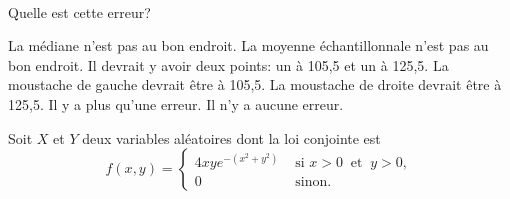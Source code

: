 \begin{questions}
\begin{center}
\begin{tikzpicture}[x=0.4cm,y=0.9cm]
			\end{tikzpicture}\\
	\end{center}



Quelle est cette erreur?

  \begin{checkboxes}
\choice La médiane n'est pas au bon endroit.  %
\choice La moyenne échantillonnale n'est pas au bon endroit. %
\choice Il devrait y avoir deux points: un à 105,5 et un à 125,5.
\choice La moustache de gauche devrait être à  105,5. 
\choice La moustache de droite devrait être à 125,5.
\choice Il y a plus qu'une erreur.
\choice Il n'y a aucune erreur.
\end{checkboxes}

\vspace{1cm}

\newpage




\question\label{conjointe}

Soit $X$ et $Y$ deux variables aléatoires dont la loi conjointe est 
$$f(x,y)=\left\{
			\begin{array}{ll}
   \displaystyle 4xye^{-(x^2+y^2)}  & \mbox{ si } x> 0\ \mbox{ et } \ y>0, \\
    0  & \mbox{ sinon. }
			\end{array}
			\right.$$



\end{questions}

